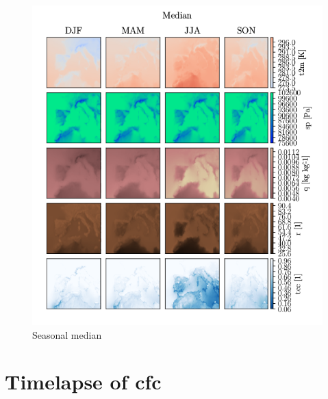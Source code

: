 \begin{figure}[ht]
    \centering
    \includegraphics{python_figs/seasonal_median_all_variables.png}
    \caption{Seasonal median}
    \label{fig:seasonal_median}
\end{figure}

\cleardoublepage
\chapter{Timelapse of \acrlong{cfc} } \label{app:timelapse}

